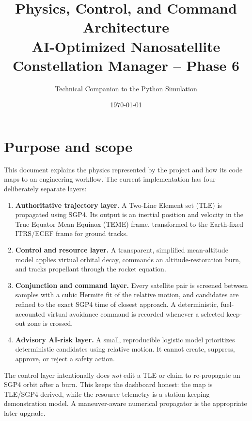 \documentclass[11pt,a4paper]{article}
\title{Physics, Control, and Command Architecture\\\large AI-Optimized Nanosatellite Constellation Manager -- Phase 6}
\author{Technical Companion to the Python Simulation}
\date{\today}
\begin{document}
\maketitle
\tableofcontents
\newpage

\section{Purpose and scope}
This document explains the physics represented by the project and how its code maps to an engineering workflow. The current implementation has four deliberately separate layers:

\begin{enumerate}
  \item \textbf{Authoritative trajectory layer.} A Two-Line Element set (TLE) is propagated using SGP4. Its output is an inertial position and velocity in the True Equator Mean Equinox (TEME) frame, transformed to the Earth-fixed ITRS/ECEF frame for ground tracks.
  \item \textbf{Control and resource layer.} A transparent, simplified mean-altitude model applies virtual orbital decay, commands an altitude-restoration burn, and tracks propellant through the rocket equation.
  \item \textbf{Conjunction and command layer.} Every satellite pair is screened between samples with a cubic Hermite fit of the relative motion, and candidates are refined to the exact SGP4 time of closest approach. A deterministic, fuel-accounted virtual avoidance command is recorded whenever a selected keep-out zone is crossed.
  \item \textbf{Advisory AI-risk layer.} A small, reproducible logistic model prioritizes deterministic candidates using relative motion. It cannot create, suppress, approve, or reject a safety action.
\end{enumerate}

The control layer intentionally does \emph{not} edit a TLE or claim to re-propagate an SGP4 orbit after a burn. This keeps the dashboard honest: the map is TLE/SGP4-derived, while the resource telemetry is a station-keeping demonstration model. A maneuver-aware numerical propagator is the appropriate later upgrade.
\end{document}
